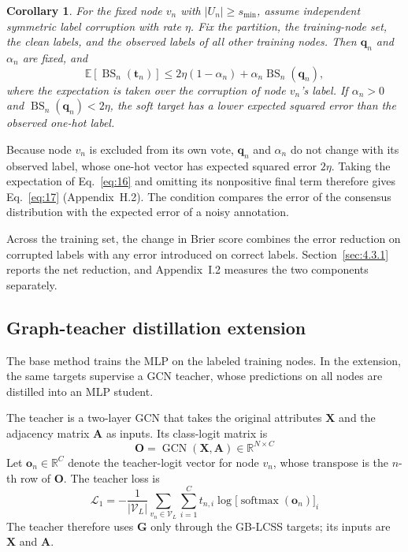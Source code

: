 \documentclass[10pt,letterpaper,nopreprintline]{elsarticle}
\theoremstyle{definition}
\theoremstyle{plain}
\newtheorem{corollary}{Corollary}
\begin{document}
\begin{corollary}\label{cor:expected}
For the fixed node \(v_n\) with \(|U_n|\geq s_{\min}\), assume independent symmetric label corruption with rate \(\eta\). Fix the partition, the training-node set, the clean labels, and the observed labels of all other training nodes. Then \(\mathbf q_n\) and \(\alpha_n\) are fixed, and
\begin{equation}\label{eq:17}
\mathbb E[\operatorname{BS}_n(\mathbf t_n)]\leq2\eta(1-\alpha_n)+\alpha_n\operatorname{BS}_n(\mathbf q_n),
\end{equation}
where the expectation is taken over the corruption of node \(v_n\)'s label. If \(\alpha_n>0\) and \(\operatorname{BS}_n(\mathbf q_n)<2\eta\), the soft target has a lower expected squared error than the observed one-hot label.
\end{corollary}

Because node \(v_n\) is excluded from its own vote, \(\mathbf q_n\) and \(\alpha_n\) do not change with its observed label, whose one-hot vector has expected squared error \(2\eta\). Taking the expectation of Eq.~\eqref{eq:16} and omitting its nonpositive final term therefore gives Eq.~\eqref{eq:17} (Appendix~H.2). The condition compares the error of the consensus distribution with the expected error of a noisy annotation.

Across the training set, the change in Brier score combines the error reduction on corrupted labels with any error introduced on correct labels. Section~\ref{sec:4.3.1} reports the net reduction, and Appendix~I.2 measures the two components separately.

\subsection{Graph-teacher distillation extension}\label{sec:3.5}

The base method trains the MLP on the labeled training nodes. In the extension, the same targets supervise a GCN teacher, whose predictions on all nodes are distilled into an MLP student.

\Needspace{64pt}
The teacher is a two-layer GCN that takes the original attributes \(\mathbf X\) and the adjacency matrix \(\mathbf A\) as inputs. Its class-logit matrix is
\begin{equation}\label{eq:18}
\mathbf O=\operatorname{GCN}(\mathbf X,\mathbf A)\in\mathbb R^{N\times C}
\end{equation}
Let \(\mathbf o_n\in\mathbb R^C\) denote the teacher-logit vector for node \(v_n\), whose transpose is the \(n\)-th row of \(\mathbf O\). The teacher loss is
\begin{equation}\label{eq:19}
\mathcal L_1=-\frac{1}{|\mathcal V_L|}\sum_{v_n\in\mathcal V_L}\sum_{i=1}^C t_{n,i}\log\bigl[\operatorname{softmax}(\mathbf o_n)\bigr]_i
\end{equation}
The teacher therefore uses \(\mathbf G\) only through the GB-LCSS targets; its inputs are \(\mathbf X\) and \(\mathbf A\).
\end{document}
